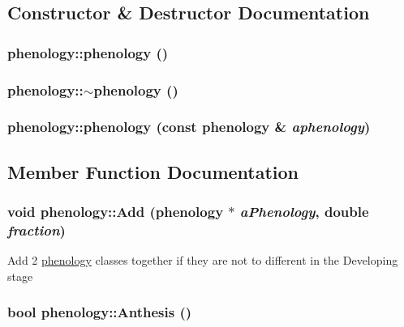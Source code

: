 \subsection{Constructor \& Destructor Documentation}
\hypertarget{classphenology_a1694ce5b60300e31f802d56359a24bdd}{
\subsubsection[{phenology}]{\setlength{\rightskip}{0pt plus 5cm}phenology::phenology ()}}
\label{classphenology_a1694ce5b60300e31f802d56359a24bdd}
\hypertarget{classphenology_a263df25145508d60fb2a5e8e401d895e}{
\subsubsection[{$\sim$phenology}]{\setlength{\rightskip}{0pt plus 5cm}phenology::$\sim$phenology ()}}
\label{classphenology_a263df25145508d60fb2a5e8e401d895e}
\hypertarget{classphenology_a6f0636f83d10f27a541221c58edcce57}{
\subsubsection[{phenology}]{\setlength{\rightskip}{0pt plus 5cm}phenology::phenology (const {\bf phenology} \& {\em aphenology})}}
\label{classphenology_a6f0636f83d10f27a541221c58edcce57}


\subsection{Member Function Documentation}
\hypertarget{classphenology_ad33769d1f209f2cccb78c26d4127161e}{
\subsubsection[{Add}]{\setlength{\rightskip}{0pt plus 5cm}void phenology::Add ({\bf phenology} $\ast$ {\em aPhenology}, \/  double {\em fraction})}}
\label{classphenology_ad33769d1f209f2cccb78c26d4127161e}
Add 2 \hyperlink{classphenology}{phenology} classes together if they are not to different in the Developing stage \hypertarget{classphenology_a9f571608ca2e2eaf7d1a79715afa8e0c}{
\subsubsection[{Anthesis}]{\setlength{\rightskip}{0pt plus 5cm}bool phenology::Anthesis ()}}
\label{classphenology_a9f571608ca2e2eaf7d1a79715afa8e0c}


